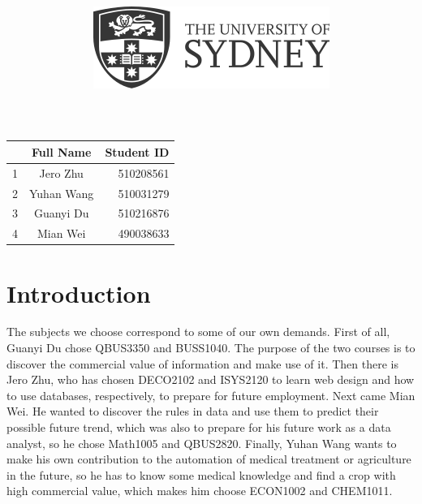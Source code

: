 \documentclass[12pt]{article}
\title{\includegraphics[scale=.5]{usydlogo.png}
\linebreak \\
\noindent \scalebox{1}{\textbf{\helveticafamily INFO1111: Computing 1A Professionalism}}
}
\date{\noindent \scalebox{1}{\textbf{\helveticafamily Semester 1 2021}}}
\author{\noindent \scalebox{1}{\textbf{\helveticafamily Project 2B}}}
\newcommand\helveticafamily{\fontfamily{phv} \selectfont}
\begin{document}
\maketitle
\begin{center}
    \textbf{\noindent \scalebox{1}{\textbf{\helveticafamily Group Number: 3}}}
\end{center}


\begin{center}
\begin{tabular}{|l|c|r|}
\hline
  & Full Name & Student ID \\ \hline
1 & Jero Zhu  & 510208561  \\ \hline
2 & Yuhan Wang& 510031279  \\ \hline
3 & Guanyi Du & 510216876  \\ \hline
4 & Mian Wei  & 490038633  \\ \hline
\end{tabular}
\end{center}

\thispagestyle{empty}
\newpage

\tableofcontents %
\setcounter{page}{1}
\newpage
\section{Introduction}
The subjects we choose correspond to some of our own demands. First of all, Guanyi Du chose QBUS3350 and BUSS1040. The purpose of the two courses is to discover the commercial value of information and make use of it. Then there is Jero Zhu, who has chosen DECO2102 and ISYS2120 to learn web design and how to use databases, respectively, to prepare for future employment. Next came Mian Wei. He wanted to discover the rules in data and use them to predict their possible future trend, which was also to prepare for his future work as a data analyst, so he chose Math1005 and QBUS2820. Finally, Yuhan Wang wants to make his own contribution to the automation of medical treatment or agriculture in the future, so he has to know some medical knowledge and find a crop with high commercial value, which makes him choose ECON1002 and CHEM1011.

\newpage
\end{document}
